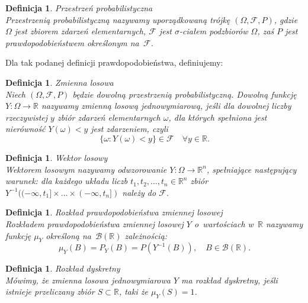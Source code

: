 \documentclass[12pt,a4paper]{report}
\newtheorem{definition}[theorem]{Definicja}
\begin{document}
\begin{definition}{Przestrzeń probabilistyczna \cite[w oparciu o~rozdział 1.2]{krysicki1999}}\\
Przestrzenią probabilistyczną nazywamy uporządkowaną trójkę $(\Omega, \mathcal{F}, P)$, gdzie $\Omega$ jest zbiorem zdarzeń elementarnych, $\mathcal{F}$ jest $\sigma$-ciałem podzbiorów $\Omega$, zaś $P$ jest prawdopodobieństwem określonym na~$\mathcal{F}$.
\end{definition}

Dla tak podanej definicji prawdopodobieństwa, definiujemy:

\begin{definition}{Zmienna losowa \cite[Rozdział 2.1]{krysicki1999}}\\
Niech $(\Omega, \mathcal{F}, P)$ będzie dowolną przestrzenią probabilistyczną. Dowolną funkcję $\textit{Y} : \Omega \rightarrow \mathbb{R}$ nazywamy zmienną losową jednowymiarową, jeśli dla dowolnej liczby rzeczywistej $y$ zbiór zdarzeń elementarnych $\omega$, dla których spełniona jest nierówność $Y(\omega)< y$ jest zdarzeniem, czyli 
$$\{\omega: Y(\omega) < y \} \in \mathcal{F}\quad \forall y \in \mathbb{R}.$$

\end{definition}


\begin{definition}{Wektor losowy \cite[Rozdział 5.1]{jakubowski2004}}\\
Wektorem losowym nazywamy odwzorowanie $Y:\Omega \rightarrow \mathbb{R}^n$, spełniające następujący warunek: dla każdego układu liczb $t_1,t_2,\ldots,t_n \in \mathbb{R}^n$ zbiór $Y^{-1}((-\infty,t_1]\times \ldots \times(-\infty,t_n])$ należy do $\mathcal{F}$.
\end{definition}


\begin{definition}{Rozkład prawdopodobieństwa zmiennej losowej \cite[Rozdział 5.1]{jakubowski2004}}\\
Rozkładem prawdopodobieństwa zmiennej losowej $Y$ o~wartościach w~$\mathbb{R}$ nazywamy funkcję $\mu_Y$ określoną na~$\mathcal{B}(\mathbb{R})$ zależnością:
$$\mu_Y(B)=P_Y(B)=P(Y^{-1}(B)), \quad B \in \mathcal{B}(\mathbb{R}).$$
 
\end{definition}


\begin{definition}{Rozkład dyskretny \cite[Rozdział 5.1]{jakubowski2004}}\\
Mówimy, że zmienna losowa jednowymiarowa $Y$ ma rozkład dyskretny, jeśli istnieje przeliczany zbiór $S \subset \mathbb{R}$, taki że $\mu_Y(S)=1$.
\end{definition}
\end{document}
